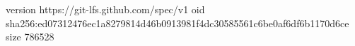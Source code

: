 version https://git-lfs.github.com/spec/v1
oid sha256:ed07312476ec1a8279814d46b0913981f4dc30585561c6be0af6df6b1170d6ce
size 786528
